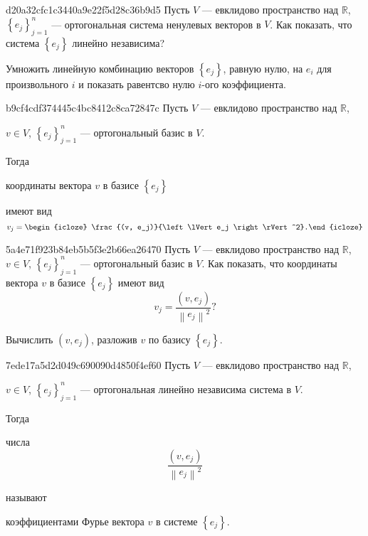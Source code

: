 \begin{note}{d20a32cfc1c3440a9e22f5d28c36b9d5}
    Пусть \({ V }\) --- евклидово пространство над \({ \mathbb R }\),\: \({ \left\{ e_j \right\}_{j = 1}^{n} }\) --- ортогональная система ненулевых векторов в \({ V }\).
    Как показать, что система \({ \left\{ e_j \right\} }\) линейно независима?

    \begin{cloze}{1}
        Умножить линейную комбинацию векторов \({ \left\{ e_j \right\} }\), равную нулю, на \({ e_i }\) для произвольного \({ i }\) и показать равентсво нулю \({ i }\)-ого коэффициента.
    \end{cloze}
\end{note}

\begin{note}{b9cf4cdf374445c4bc8412c8ca72847c}
    Пусть \({ V }\) --- евклидово пространство над \({ \mathbb R }\),\: \begin{icloze}{3}\({ v \in V }\),\: \({ \left\{ e_j \right\}_{j = 1}^{n} }\) --- ортогональный базис в \({ V }\).\end{icloze}
    Тогда \begin{icloze}{2}координаты вектора \({ v }\) в базисе \({ \left\{ e_j \right\} }\)\end{icloze} имеют вид
    \[
        v_j = \begin{icloze}{1}\frac{(v, e_j)}{\left\lVert e_j \right\rVert^2}.\end{icloze}
    \]
\end{note}

\begin{note}{5a4e71f923b84eb5b5f3e2b66ea26470}
    Пусть \({ V }\) --- евклидово пространство над \({ \mathbb R }\),\: \({ v \in V }\),\: \({ \left\{ e_j \right\}_{j = 1}^{n} }\) --- ортогональный базис в \({ V }\).
    Как показать, что координаты вектора \({ v }\) в базисе \({ \left\{ e_j \right\} }\) имеют вид
    \[
        v_j = \frac{(v, e_j)}{\left\lVert e_j \right\rVert^2}?
    \]

    \begin{cloze}{1}
        Вычислить \({ (v, e_j) }\), разложив \({ v }\) по базису \({ \left\{ e_j \right\} }\).
    \end{cloze}
\end{note}

\begin{note}{7ede17a5d2d049c690090d4850f4ef60}
    Пусть \({ V }\) --- евклидово пространство над \({ \mathbb R }\),\: \begin{icloze}{3}\({ v \in V }\),\: \({ \left\{ e_j \right\}_{j = 1}^{n} }\) --- ортогональная линейно независима система в \({ V }\).\end{icloze}
    Тогда \begin{icloze}{1}числа
    \[
        \frac{(v, e_j)}{\left\lVert e_j \right\rVert^2}
    \]\end{icloze}
    называют \begin{icloze}{2}коэффициентами Фурье вектора \({ v }\) в системе \({ \left\{ e_j \right\} }\).\end{icloze}
\end{note}

